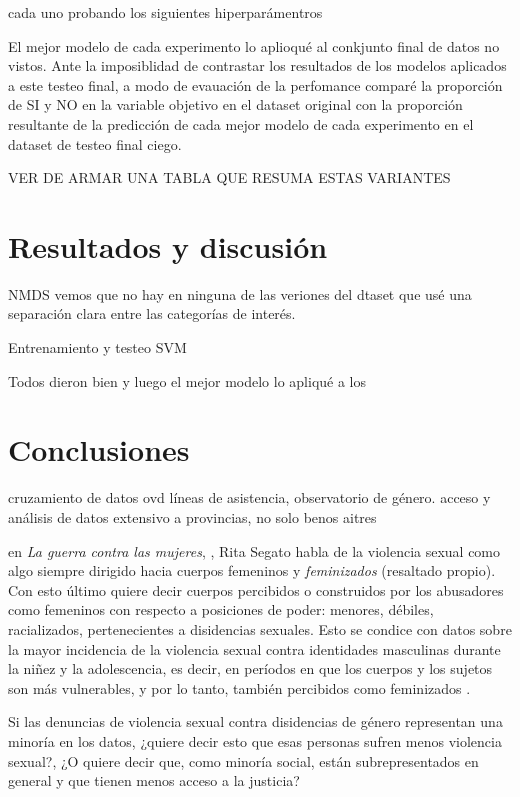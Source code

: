 \documentclass[10 pt]{article}
\begin{document}
cada uno probando los siguientes hiperparámentros

El mejor modelo de cada experimento lo aplioqué al conkjunto final de datos no vistos. Ante la imposiblidad de contrastar los resultados de los modelos aplicados a este testeo final, a modo de evauación de la perfomance comparé la proporción de SI y NO en la variable objetivo en el dataset original con la proporción resultante de la predicción de cada mejor modelo de cada experimento en el dataset de testeo final ciego.

VER DE ARMAR UNA TABLA QUE RESUMA ESTAS VARIANTES 


\section{Resultados y discusión}\label{resultados}

NMDS vemos que no hay en ninguna de las veriones del dtaset que usé una separación clara entre las categorías de interés.

Entrenamiento y testeo SVM

Todos dieron bien y luego el mejor modelo lo apliqué a  los

\section{Conclusiones}\label{conc}
cruzamiento de datos ovd líneas de asistencia, observatorio de género.
acceso y análisis de datos extensivo a provincias, no solo benos aitres



en \textit{La guerra contra las mujeres}, \citeyearpar{segato2016guerra}, Rita Segato habla de la violencia sexual como algo siempre dirigido hacia cuerpos femeninos y \textit{feminizados} (resaltado propio). Con esto último quiere decir cuerpos percibidos o construidos por los abusadores como femeninos con respecto a posiciones de poder: menores, débiles, racializados, pertenecientes a disidencias sexuales. Esto se condice con datos sobre la mayor incidencia de la violencia sexual contra identidades masculinas durante la niñez y la adolescencia, es decir, en períodos en que los cuerpos y los sujetos son más vulnerables, y por lo tanto, también percibidos como feminizados \citep*{contreras2016violencia,ufem_relevamiento,ferris2002world}.

Si las denuncias de violencia sexual contra disidencias de género representan una minoría en los datos, ¿quiere decir esto que esas personas sufren menos violencia sexual?, ¿O quiere decir que, como minoría social, están subrepresentados en general y que tienen menos acceso a la justicia?
\end{document}
